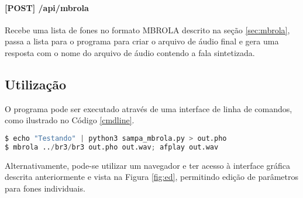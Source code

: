\paragraph{[POST] /api/mbrola} Recebe uma lista de fones no formato MBROLA
descrito na seção \ref{sec:mbrola}, passa a lista para o programa para criar o
arquivo de áudio final e gera uma resposta com o nome do arquivo de áudio
contendo a fala sintetizada.
\subsection{Utilização}
O programa pode ser executado através de uma interface de linha de comandos,
como ilustrado no Código \ref{cmdline}.

\begin{lstlisting}[caption=Utilização por linha de comandos, label=cmdline, language=Python]
$ echo "Testando" | python3 sampa_mbrola.py > out.pho
$ mbrola ../br3/br3 out.pho out.wav; afplay out.wav
\end{lstlisting}

Alternativamente, pode-se utilizar um navegador e ter acesso à interface
gráfica descrita anteriormente e vista na Figura \ref{fig:ed}, permitindo edição de parâmetros para fones individuais.


